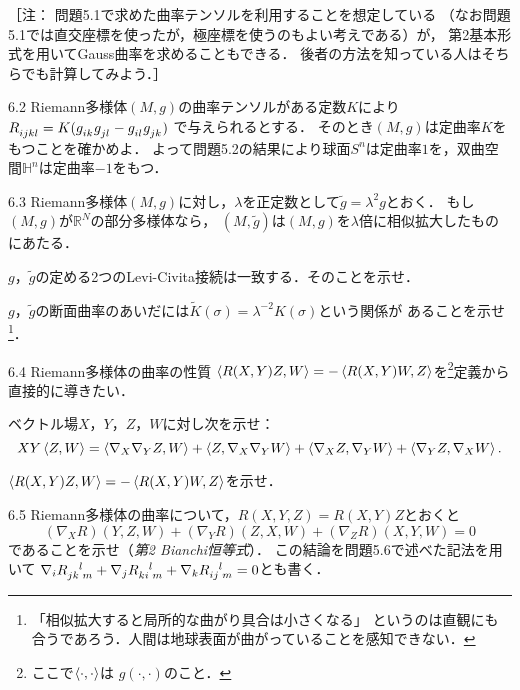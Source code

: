 \documentclass[uplatex,dvipdfmx,fontsize=12pt,jafontsize=11pt,line_length=42zw,number_of_lines=36,hanging_punctuation]{jlreq}
\begin{document}
\begin{problems}
		［注：
		問題5.1で求めた曲率テンソルを利用することを想定している
		（なお問題5.1では直交座標を使ったが，極座標を使うのもよい考えである）が，
		第2基本形式を用いてGauss曲率を求めることもできる．
		後者の方法を知っている人はそちらでも計算してみよう．］
	\item[6.2]
		Riemann多様体$(M,g)$の曲率テンソルがある定数$K$により
		$\tensor{R}{_i_j_k_l}=K(\tensor{g}{_i_k}\tensor{g}{_j_l}-\tensor{g}{_i_l}\tensor{g}{_j_k})$
		で与えられるとする．
		そのとき$(M,g)$は定曲率$K$をもつことを確かめよ．
		よって問題5.2の結果により球面$S^n$は定曲率$1$を，双曲空間$\mathbb{H}^n$は定曲率$-1$をもつ．
	\item[6.3]
		Riemann多様体$(M,g)$に対し，$\lambda$を正定数として$\tilde{g}=\lambda^2g$とおく．
		もし$(M,g)$が$\mathbb{R}^N$の部分多様体なら，
		$(M,\tilde{g})$は$(M,g)$を$\lambda$倍に相似拡大したものにあたる．
		\begin{subproblems}
			\item
				$g$，$\tilde{g}$の定める2つのLevi-Civita接続は一致する．そのことを示せ．
			\item
				$g$，$\tilde{g}$の断面曲率のあいだには$\tilde{K}(\sigma)=\lambda^{-2}K(\sigma)$という関係が
				あることを示せ\footnote{「相似拡大すると局所的な曲がり具合は小さくなる」
				というのは直観にも合うであろう．人間は地球表面が曲がっていることを感知できない．}．
		\end{subproblems}
	\item[6.4]
		Riemann多様体の曲率の性質
		$\braket{R(X,Y)Z,W}=-\braket{R(X,Y)W,Z}$を\footnote{ここで$\braket{\cdot,\cdot}$は
		$g(\cdot,\cdot)$のこと．}定義から直接的に導きたい．
		\begin{subproblems}
			\item
				ベクトル場$X$，$Y$，$Z$，$W$に対し次を示せ：
				\begin{equation}
					XY\braket{Z,W}=\braket{\nabla_X\nabla_YZ,W}+\braket{Z,\nabla_X\nabla_YW}
					+\braket{\nabla_XZ,\nabla_YW}+\braket{\nabla_YZ,\nabla_XW}.
				\end{equation}
			\item
				$\braket{R(X,Y)Z,W}=-\braket{R(X,Y)W,Z}$を示せ．
		\end{subproblems}
	\item[6.5]
		Riemann多様体の曲率について，$R(X,Y,Z)=R(X,Y)Z$とおくと
		\begin{equation}
			(\nabla_XR)(Y,Z,W)+(\nabla_YR)(Z,X,W)+(\nabla_ZR)(X,Y,W)=0
		\end{equation}
		であることを示せ（\emph{第2 Bianchi恒等式}）．
		この結論を問題5.6で述べた記法を用いて
		$\nabla_i\tensor{R}{_j_k^l_m}+\nabla_j\tensor{R}{_k_i^l_m}+\nabla_k\tensor{R}{_i_j^l_m}=0$とも書く．
\end{problems}
\end{document}

